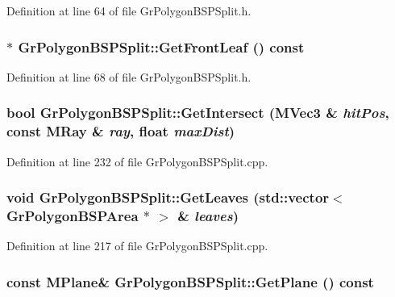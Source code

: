 Definition at line 64 of file GrPolygonBSPSplit.h.\hypertarget{class_gr_polygon_b_s_p_split_585ea05b4c4d67c5851c2176f902ccfd}{
\subsubsection[{GetFrontLeaf}]{$\ast$ GrPolygonBSPSplit::GetFrontLeaf () const}}
\label{class_gr_polygon_b_s_p_split_585ea05b4c4d67c5851c2176f902ccfd}




Definition at line 68 of file GrPolygonBSPSplit.h.\hypertarget{class_gr_polygon_b_s_p_split_433757920d1eb0b2e0d97b2def097c2e}{
\subsubsection[{GetIntersect}]{\setlength{\rightskip}{0pt plus 5cm}bool GrPolygonBSPSplit::GetIntersect ({\bf MVec3} \& {\em hitPos}, \/  const {\bf MRay} \& {\em ray}, \/  float {\em maxDist})}}
\label{class_gr_polygon_b_s_p_split_433757920d1eb0b2e0d97b2def097c2e}




Definition at line 232 of file GrPolygonBSPSplit.cpp.\hypertarget{class_gr_polygon_b_s_p_split_55b5ad7a259b99d040f6e933fce59c9e}{
\subsubsection[{GetLeaves}]{\setlength{\rightskip}{0pt plus 5cm}void GrPolygonBSPSplit::GetLeaves (std::vector$<$ {\bf GrPolygonBSPArea} $\ast$ $>$ \& {\em leaves})}}
\label{class_gr_polygon_b_s_p_split_55b5ad7a259b99d040f6e933fce59c9e}




Definition at line 217 of file GrPolygonBSPSplit.cpp.\hypertarget{class_gr_polygon_b_s_p_split_1ccd3b94364851f152fb982679c2b348}{
\subsubsection[{GetPlane}]{\setlength{\rightskip}{0pt plus 5cm}const {\bf MPlane}\& GrPolygonBSPSplit::GetPlane () const}}
\label{class_gr_polygon_b_s_p_split_1ccd3b94364851f152fb982679c2b348}




